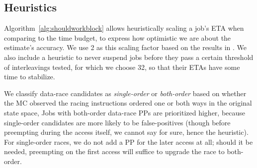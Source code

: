 \subsection{Heuristics}
Algorithm~\ref{alg:shouldworkblock} allows heuristically scaling a job's ETA when comparing to the time budget,
to express how optimistic we are about the estimate's accuracy.
We use 2 as this scaling factor based on the results in \cite{estimation}.
We also include a heuristic to
never suspend jobs before they pass a certain threshold of interleavings tested,
for which we choose 32,
so that their ETAs have some time to stabilize.

We classify data-race candidates as {\em single-order} or {\em both-order} \cite{portend}
based on whether the MC observed the racing instructions ordered one or both ways in the original state space,
Jobs with both-order data-race PPs are prioritized higher,
because single-order candidates are more likely to be false-positives
(though before preempting during the access itself, we cannot say for sure, hence the heuristic).
For single-order races, we do not add a PP for the later access at all;
should it be needed, preempting on the first access will suffice to upgrade the race to both-order.

